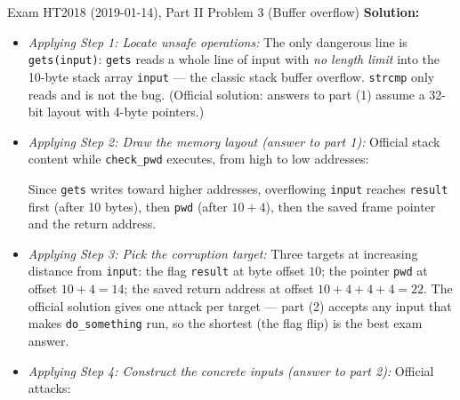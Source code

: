 \documentclass[12pt, a4paper]{article}
\begin{document}
\begin{practicebox}{Exam HT2018 (2019-01-14), Part II Problem 3 (Buffer overflow)}
\textbf{Solution:}
\begin{itemize}
    \item \textit{Applying Step 1: Locate unsafe operations:} The only dangerous line is \texttt{gets(input)}: \texttt{gets} reads a whole line of input with \emph{no length limit} into the 10-byte stack array \texttt{input} --- the classic stack buffer overflow.
    \texttt{strcmp} only reads and is not the bug. (Official solution: answers to part (1) assume a 32-bit layout with 4-byte pointers.)
    \item \textit{Applying Step 2: Draw the memory layout (answer to part 1):} Official stack content while \texttt{check\_pwd} executes, from high to low addresses:
    Since \texttt{gets} writes toward higher addresses, overflowing \texttt{input} reaches \texttt{result} first (after 10 bytes), then \texttt{pwd} (after $10+4$), then the saved frame pointer and the return address.
    \item \textit{Applying Step 3: Pick the corruption target:} Three targets at increasing distance from \texttt{input}: the flag \texttt{result} at byte offset $10$; the pointer \texttt{pwd} at offset $10 + 4 = 14$; the saved return address at offset $10 + 4 + 4 + 4 = 22$.
    The official solution gives one attack per target --- part (2) accepts any input that makes \texttt{do\_something} run, so the shortest (the flag flip) is the best exam answer.
    \item \textit{Applying Step 4: Construct the concrete inputs (answer to part 2):} Official attacks:
\end{itemize}
\end{practicebox}
\end{document}
